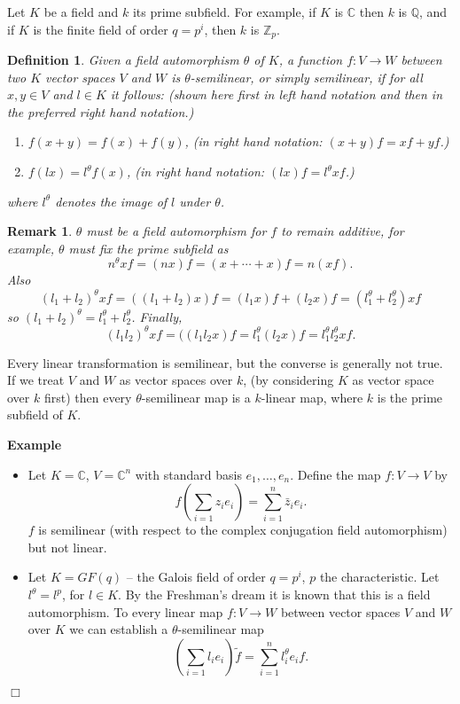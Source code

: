 \documentclass[12pt]{article}
\newtheorem{defn}[thm]{Definition}
\newtheorem{remark}[thm]{Remark}
\begin{document}
Let $K$ be a field and $k$ its prime subfield.  For example, if $K$ is $\mathbb{C}$ then $k$ is $\mathbb{Q}$, and if $K$ is the finite field of order $q=p^i$, then $k$ is $\mathbb{Z}_p$.

\begin{defn}
Given a field automorphism $\theta$ of $K$, a function
$f:V\rightarrow W$ between two $K$ vector spaces $V$ and $W$ is 
$\theta$-semilinear, or simply semilinear, if for all $x,y\in V$ and $l\in K$ 
it follows:  (shown here first in left hand notation and then in the preferred right hand notation.)
\begin{enumerate}
\item $f(x+y)=f(x)+f(y)$,  (in right hand notation: $(x+y)f=xf+yf$.)
\item $f(lx)=l^\theta f(x)$, (in right hand notation: $(lx)f=l^\theta xf$.)
\end{enumerate}
where $l^\theta$ denotes the image of $l$ under $\theta$.
\end{defn}

\begin{remark}
$\theta$ must be a field automorphism for $f$ to remain additive, for example,
$\theta$ must fix the prime subfield as
\[n^\theta xf=(nx)f=(x+\cdots +x)f=n(xf).\]
Also 
\[(l_1+l_2)^\theta xf=((l_1+l_2)x)f=(l_1 x)f+(l_2 x)f=(l_1^\theta + l_2^\theta)xf\]
so $(l_1+l_2)^\theta=l_1^\theta+l_2^\theta$.  Finally,
\[(l_1 l_2)^\theta xf=((l_1 l_2 x)f=l_1^\theta (l_2 x)f=l_1^\theta l_2^\theta xf.\]
\end{remark}

Every linear transformation is semilinear, but the converse is generally not true.  If we treat $V$ and $W$ as vector spaces over $k$, (by considering $K$ as  vector space over $k$ first) then every $\theta$-semilinear map is a $k$-linear map, where $k$ is the prime subfield of $K$.  

\textbf{Example}
\begin{itemize}
\item
Let $K=\mathbb{C}$, $V=\mathbb{C}^n$ with standard basis $e_1,\dots,e_n$.  Define the map $f:V\rightarrow V$ by 
      \[f\left(\sum_{i=1}z_i e_i\right)=\sum_{i=1}^n \bar{z}_i e_i.\]
$f$ is semilinear (with respect to the complex conjugation field automorphism)
but not linear. 
\item
Let $K=GF(q)$ -- the Galois field of order $q=p^i$, $p$ the characteristic.
Let $l^\theta=l^p$, for $l\in K$.  By the Freshman's dream it is known that this is a field automorphism.  To every linear map $f:V\rightarrow W$ between 
vector spaces $V$ and $W$ over $K$ we can establish a $\theta$-semilinear map
      \[\left(\sum_{i=1}l_i e_i\right)\tilde{f}=\sum_{i=1}^n l_i^\theta e_i f.\]
\end{itemize}
$\Box$
\end{document}
